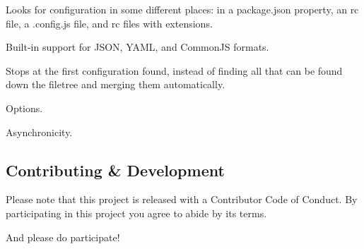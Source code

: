\begin{DoxyItemize}
\item Looks for configuration in some different places\+: in a {\ttfamily package.\+json} property, an rc file, a {\ttfamily .config.\+js} file, and rc files with extensions.
\item Built-\/in support for J\+S\+ON, Y\+A\+ML, and Common\+JS formats.
\item Stops at the first configuration found, instead of finding all that can be found down the filetree and merging them automatically.
\item Options.
\item Asynchronicity.
\end{DoxyItemize}

\subsection*{Contributing \& Development}

Please note that this project is released with a Contributor Code of Conduct. By participating in this project you agree to abide by its terms.

And please do participate! 